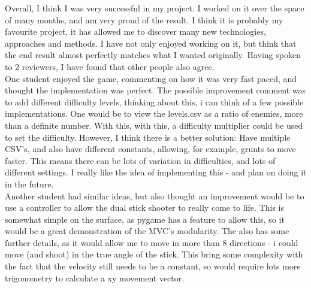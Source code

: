 
Overall, I think I was very successful in my project. I worked on it over the space of many months, and am very proud of the result. I think it is probably my favourite project, it has allowed me to discover many new technologies, approaches and methods. I have not only enjoyed working on it, but think that the end result almost perfectly matches what I wanted originally. Having spoken to 2 reviewers, I have found that other people also agree. \\

One student enjoyed the game, commenting on how it was very fast paced, and thought the implementation was perfect. The possible improvement comment was to add different difficulty levels, thinking about this, i can think of a few possible implementations. One would be to view the levels.csv as a ratio of enemies, more than a definite number. With this, with this, a difficulty multiplier could be used to set the difficulty. However, I think there is a better solution: Have multiple CSV's, and also have different constants, allowing, for example, grunts to move faster. This means there can be lots of variation in difficulties, and lots of different settings. I really like the idea of implementing this - and plan on doing it in the future.\\

Another student had similar ideas, but also thought an improvement would be to use a controller to allow the dual stick shooter to really come to life. This is somewhat simple on the surface, as pygame has a feature to allow this, so it would be a great demonstration of the MVC's modularity. The also has some further details, as it would allow me to move in more than 8 directions - i could move (and shoot) in the true angle of the stick. This bring some complexity with the fact that the velocity still needs to be a constant, so would require lots more trigonometry to calculate a xy movement vector.\\

